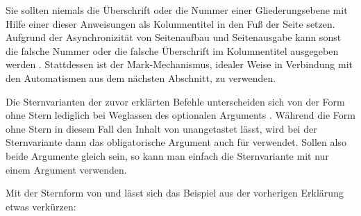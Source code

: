 \iftrue%
\leavevmode{}%
\else Erlauben Sie mir erneut einen wichtigen Hinweis:\textnote{Achtung!} %
\fi%
Sie sollten niemals die Überschrift oder die Nummer einer
Gliederungsebene mit Hilfe einer dieser Anweisungen als Kolumnentitel in den
Fuß der Seite setzen. Aufgrund der Asynchronizität von Seitenaufbau und
Seitenausgabe kann %
\iffalse%
es sonst leicht geschehen, dass die falsche Nummer oder die falsche
Überschrift im Kolumnentitel ausgegeben wird%
\else%
sonst die falsche Nummer oder die falsche Überschrift im Kolumnentitel
ausgegeben werden%
\fi%
. Stattdessen ist der Mark-Mechanismus, idealer Weise in Verbindung mit den
Automatismen aus dem nächsten Abschnitt, zu verwenden.%
\EndIndexGroup


\begin{Declaration}
\end{Declaration}
Die Sternvarianten der zuvor
erklärten Befehle unterscheiden sich von der Form ohne Stern lediglich bei
Weglassen des optionalen Arguments . Während die Form ohne Stern in diesem Fall den Inhalt
von  unangetastet lässt, wird
bei der Sternvariante dann das obligatorische Argument  auch für 
verwendet. Sollen also beide Argumente gleich sein, so kann man einfach die
Sternvariante mit nur einem Argument verwenden.%
%
\begin{Example}
  Mit der Sternform von  und
   lässt sich das
  Beispiel aus der vorherigen Erklärung etwas verkürzen:
\end{Example}%
%
\EndIndexGroup
\ExampleEndFix


